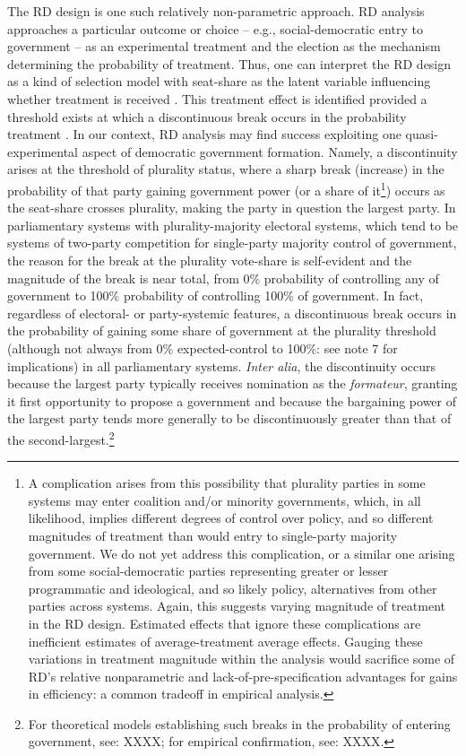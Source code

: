 \documentclass[12pt]{article}
\begin{document}
The RD design is one such relatively non-parametric approach. RD analysis \citep{Hahn2001, Calonico2014} approaches a particular outcome or choice -- e.g., social-democratic entry to government -- as an experimental treatment and the election as the mechanism determining the probability of treatment. Thus, one can interpret the RD design as a kind of selection model with seat-share as the latent variable influencing whether treatment is received \citep{Heckman1978, Heckman1979}. This treatment effect is identified provided a threshold exists at which a discontinuous break occurs in the probability treatment \citep{Hahn2001}. In our context, RD analysis may find success exploiting one quasi-experimental aspect of democratic government formation. Namely, a discontinuity arises at the threshold of plurality status, where a sharp break (increase) in the probability of that party gaining government power (or a share of it\footnote{A complication arises from this possibility that plurality parties in some systems may enter coalition and/or minority governments, which, in all likelihood, implies different degrees of control over policy, and so different magnitudes of treatment than would entry to single-party majority government. We do not yet address this complication, or a similar one arising from some social-democratic parties representing greater or lesser programmatic and ideological, and so likely policy, alternatives from other parties across systems. Again, this suggests varying magnitude of treatment in the RD design. Estimated effects that ignore these complications are inefficient estimates of average-treatment average effects. Gauging these variations in treatment magnitude within the analysis would sacrifice some of RD's relative nonparametric and lack-of-pre-specification advantages for gains in efficiency: a common tradeoff in empirical analysis.}) occurs as the seat-share crosses plurality, making the party in question the largest party. In parliamentary systems with plurality-majority electoral systems, which tend to be systems of two-party competition for single-party majority control of government, the reason for the break at the plurality vote-share is self-evident and the magnitude of the break is near total, from 0\% probability of controlling any of government to 100\% probability of controlling 100\% of government. In fact, regardless of electoral- or party-systemic features, a discontinuous break occurs in the probability of gaining some share of government at the plurality threshold (although not always from 0\% expected-control to 100\%: see note 7 for implications) in all parliamentary systems. \textit{Inter alia}, the discontinuity occurs because the largest party typically receives nomination as the \textit{formateur}, granting it first opportunity to propose a  government and because the bargaining power of the largest party tends more generally to be discontinuously greater than that of the second-largest.\footnote{ For theoretical models establishing such breaks in the probability of entering government, see: XXXX; for empirical confirmation, see: XXXX.} %
\end{document}
